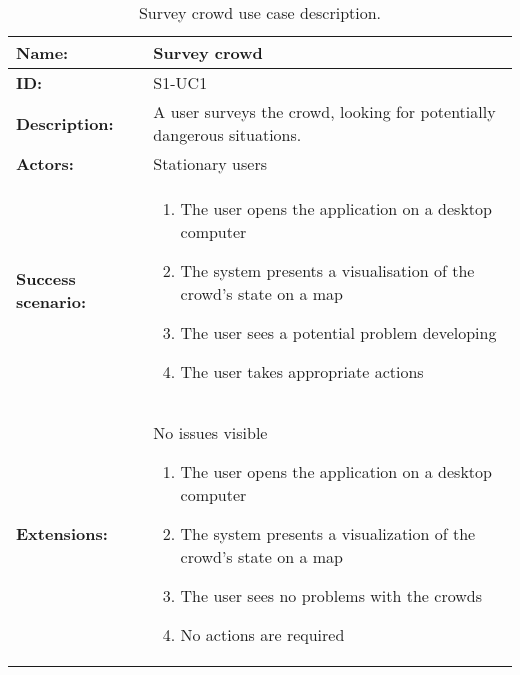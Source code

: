 \begin{table}[h!]
    \centering
    \begin{tabularx}{\textwidth}{l X}
        \toprule
        \textbf{Name:}  & Survey crowd \\ \midrule
        \textbf{ID:}    & S1-UC1 \\ \midrule
        \textbf{Description:} & A user surveys the crowd, looking for potentially dangerous situations. \\ \midrule
        \textbf{Actors:} & Stationary users \\ \midrule
        \textbf{Success scenario:} & 
        \begin{enumerate}
            \item The user opens the application on a desktop computer
            \item The system presents a visualisation of the crowd's state on a map
            \item The user sees a potential problem developing
            \item The user takes appropriate actions
        \end{enumerate}
        \\ \midrule
        \textbf{Extensions:} & No issues visible
        \begin{enumerate}
            \item The user opens the application on a desktop computer
            \item The system presents a visualization of the crowd's state on a map
            \item The user sees no problems with the crowds
            \item No actions are required
        \end{enumerate} 
        \\ \bottomrule
    \end{tabularx}
    \caption{Survey crowd use case description.}
    \label{tab:s1-uc1}
\end{table}